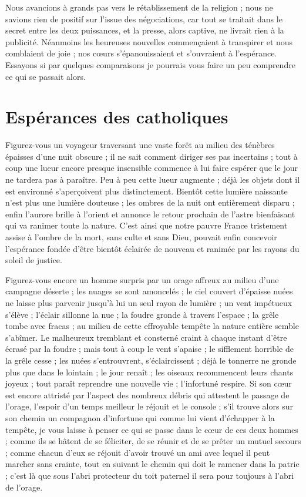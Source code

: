 Nous avancions à grands pas vers le rétablissement de la religion ; nous ne savions rien de positif sur l'issue des négociations, car tout se traitait dans le secret entre les deux puissances, et la presse, alors captive, ne livrait rien à la publicité. Néanmoins les heureuses nouvelles commençaient à transpirer et nous comblaient de joie ; nos cœurs s'épanouissaient et s'ouvraient à l'espérance. Essayons si par quelques comparaisons
je pourrais vous faire un peu comprendre ce qui se passait alors.

\section*{Espérances des catholiques}
Figurez-vous un voyageur traversant une vaste forêt au milieu des ténèbres épaisses d'une nuit obscure ; il ne sait comment diriger ses pas incertains ; tout à coup une lueur encore presque insensible commence à lui faire espérer que le jour ne tardera pas à paraître. Peu à peu cette lueur augmente ; déjà les objets dont il est environné s'aperçoivent plus distinctement. Bientôt cette lumière naissante n'est plus une lumière douteuse ; les ombres de la nuit ont entièrement disparu ; enfin l'aurore brille à l'orient et annonce le retour prochain de l'astre bienfaisant qui va ranimer toute la nature. C'est ainsi que notre pauvre France tristement assise à l'ombre de la mort, sans culte et sans Dieu, pouvait enfin concevoir l'espérance fondée d'être bientôt éclairée de nouveau et ranimée par les rayons du soleil de justice.

Figurez-vous encore un homme surpris par un orage affreux au milieu d'une campagne déserte ; les nuages se sont amoncelés ; le ciel couvert d'épaisse nuées ne laisse plus parvenir jusqu'à lui un seul rayon de lumière ; un vent impétueux s'élève ; l'éclair sillonne la nue ; la foudre gronde à travers l'espace ; la grêle tombe avec fracas ; au milieu de cette effroyable tempête la nature entière semble s'abîmer. Le malheureux tremblant et consterné craint à chaque instant d'être écrasé
par la foudre ; mais tout à coup le vent s'apaise ; le sifflement horrible de la grêle cesse ; les nuées s'entrouvrent, s'éclaircissent ; déjà le tonnerre ne gronde plus que dans le lointain ; le jour renaît ; les oiseaux recommencent leurs chants joyeux ; tout paraît reprendre une nouvelle vie ; l'infortuné respire. Si son cœur est encore attristé par l'aspect des nombreux débris qui attestent le passage de l'orage, l'espoir d'un temps meilleur le réjouit et le console ; s'il trouve alors sur son chemin un compagnon d'infortune qui comme lui vient d'échapper à la tempête, je vous laisse à penser ce qui se passe dans le cœur de ces deux hommes ; comme ils se hâtent de se féliciter, de se réunir et de se prêter un mutuel secours ; comme chacun d'eux se réjouit d'avoir trouvé un ami avec lequel il peut marcher sans crainte, tout en suivant le chemin qui doit le ramener dans la patrie ; c'est là que sous l'abri protecteur du toit paternel il sera pour toujours à l'abri de l'orage.

